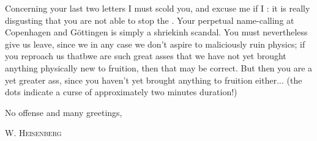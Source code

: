 Concerning your last two letters I must scold you, and excuse me if I : it is really disgusting that you are not able to stop the . Your perpetual name-calling at Copenhagen and G\"ottingen is simply a shriekinh scandal. You must nevertheless give us leave, since we in any case we don't aspire to maliciously ruin physics; if you reproach us thatbwe are such great asses that we have not yet brought anything physically new to fruition, then that may be correct. But then you are a yet greater ass, since you haven't yet brought anything to fruition either... (the dots indicate a curse of approximately two minutes duration!)

No offense and many greetings,

\textsc{W. Heisenberg}

